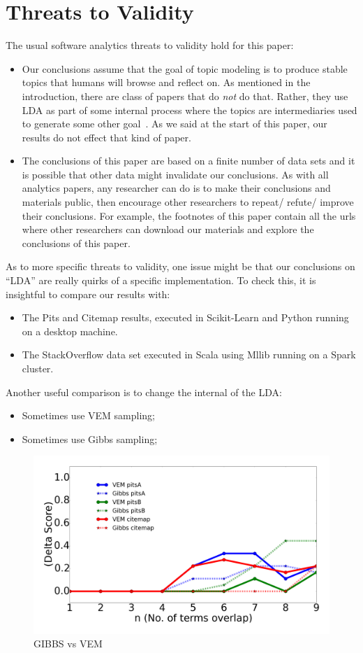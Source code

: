 \documentclass[10pt,conference]{IEEEtran}
\newcommand{\bi}{\begin{itemize}}
\newcommand{\ei}{\end{itemize}}
\theoremstyle{break}
\begin{document}
 
 

\section{Threats to Validity}
\label{sect: validity}
The usual software analytics threats to validity hold for this paper:
\bi
\item
  Our conclusions assume that the goal of topic modeling is to produce stable topics
  that humans will browse and reflect on. As mentioned in the introduction, there are
  class of papers that do {\em not} do that. Rather, they use LDA as part of some internal
  process where the topics are intermediaries
  used to generate some other goal~\cite{chen2016topic}. As we said at the start
    of this paper, our results do not effect that kind of paper.
\item
The conclusions of this paper are based on a finite number of data sets and it is possible
that other data might invalidate our conclusions. As with all analytics papers, any researcher can do is to make their conclusions and materials public, then encourage
other researchers to repeat/ refute/ improve their conclusions. For example, the footnotes of this paper contain all the urls where other researchers can download
our materials and explore the conclusions of this paper.
\ei

As to more specific threats to validity, one issue might be that our conclusions
on ``LDA'' are really quirks of a specific implementation.
To check this, it is insightful to compare our results with:
\bi
\item The Pits and Citemap results, executed in Scikit-Learn and Python running on
  a desktop machine.
\item The StackOverflow data set executed in Scala using Mllib running on a Spark cluster.
  \ei
  Another useful comparison is to change the internal of the LDA:
  \bi
\item Sometimes use VEM sampling;
\item Sometimes use Gibbs sampling;
  \ei

\begin{figure}[!htbp]
  \captionsetup{justification=centering}
  \includegraphics[width=\linewidth]{./fig/gibbs_vem1.png}
  \caption{GIBBS vs VEM}
  \label{gibbs_vem}
\end{figure}
\end{document}
